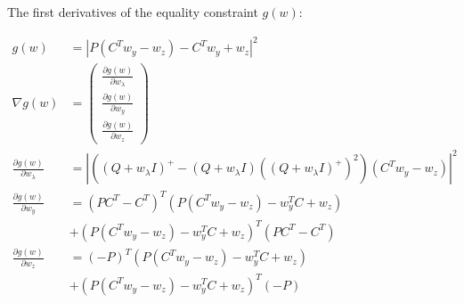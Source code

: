 \documentclass{article}
\begin{document}
The first derivatives of the equality constraint $g(w)$:

\begin{align}
	g(w) &= |P(C^Tw_y-w_z)-C^Tw_y+w_z|^2 \\
	\nabla g(w) &= \begin{pmatrix} \frac{\partial g(w)}{\partial w_\lambda} \\ \frac{\partial g(w)}{\partial w_y} \\ \frac{\partial g(w)}{\partial w_z} \end{pmatrix} \\
	\frac{\partial g(w)}{\partial w_\lambda} &= |((Q+w_\lambda I)^+-(Q+w_\lambda I)((Q+w_\lambda I)^+)^2)(C^Tw_y-w_z)|^2 \\
		   \frac{\partial g(w)}{\partial w_y} &= (PC^T-C^T)^T (P(C^Tw_y-w_z)-w_y^T C+w_z) \\ &+ (P(C^Tw_y-w_z)-w_y^T C+w_z)^T (PC^T-C^T) \\
		   \frac{\partial g(w)}{\partial w_z} &= (-P)^T (P(C^Tw_y-w_z)-w_y^T C+w_z) \\ &+ (P(C^Tw_y-w_z)-w_y^T C+w_z)^T (-P)
\end{align}
\end{document}
